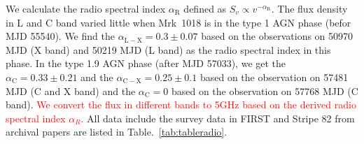 We calculate the radio spectral index $\alpha_\mathrm{R}$ defined as $S_v \propto v^{-\alpha_\mathrm{R}}$. The flux density in L and C band varied little when Mrk~1018 is in the type 1 AGN phase (befor MJD 55540). We find the $\alpha_\mathrm{L-X} =0.3 \pm 0.07$ based on the observations on 50970 MJD (X band) and 50219 MJD (L band) as the radio spectral index in this phase. In the type 1.9 AGN phase (after MJD 57033), we get the $\alpha_\mathrm{C} =0.33\pm0.21$ and the $\alpha_\mathrm{C-X} =0.25\pm0.1$ based on the observation on 57481 MJD (C and X band) and the $\alpha_\mathrm{C} =0$ based on the observation on 57768 MJD (C band). \textcolor{red}{We convert the flux in different bands to 5GHz based on the derived radio spectral index $\alpha_R$.} All data include the survey data in FIRST \citep{1994ASPC...61..165B,1995ApJ...450..559B} and Stripe 82 \citep{2011AJ....142....3H} from archival papers are listed in Table.~\ref{tab:tableradio}. 

